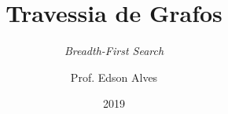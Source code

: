 \title{Travessia de Grafos}
\subtitle{\textit{Breadth-First Search}}
\date{2019}
\author{Prof. Edson Alves}
